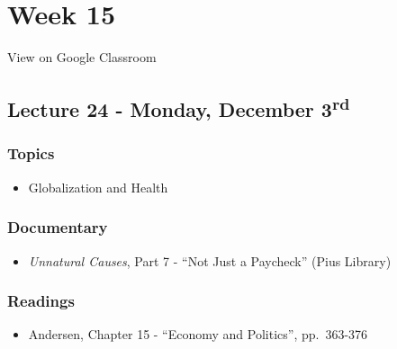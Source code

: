 \documentclass[]{book}
\providecommand{\tightlist}{%
  \setlength{\itemsep}{0pt}\setlength{\parskip}{0pt}}
\theoremstyle{definition}
\theoremstyle{definition}
\theoremstyle{definition}
\theoremstyle{remark}
\begin{document}
\hypertarget{week-15}{%
\section*{Week 15}\label{week-15}}

View on Google Classroom

\hypertarget{lecture-24---monday-december-3rd}{%
\subsection*{\texorpdfstring{Lecture 24 - Monday, December
3\textsuperscript{rd}}{Lecture 24 - Monday, December 3rd}}\label{lecture-24---monday-december-3rd}}

\hypertarget{topics-28}{%
\subsubsection*{Topics}\label{topics-28}}

\begin{itemize}
\tightlist
\item
  Globalization and Health
\end{itemize}

\hypertarget{documentary-5}{%
\subsubsection*{Documentary}\label{documentary-5}}

\begin{itemize}
\tightlist
\item
  \emph{Unnatural Causes}, Part 7 - ``Not Just a Paycheck'' (Pius
  Library)
\end{itemize}

\hypertarget{readings-26}{%
\subsubsection*{Readings}\label{readings-26}}

\begin{itemize}
\tightlist
\item
  Andersen, Chapter 15 - ``Economy and Politics'', pp.~363-376
\end{itemize}
\end{document}
